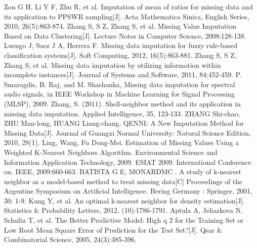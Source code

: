 \documentclass[print]{jicspack}
\begin{document}
\begin{thebibliography}{00}
 Zou G H, Li Y F, Zhu R, et al. Imputation of mean of ratios for missing data and its application to PPSWR sampling[J]. Acta Mathematica Sinica, English Series, 2010, 26(5):863-874.
 Zhang S, S Z, Zhang S, et al. Missing Value Imputation Based on Data Clustering[J]. Lecture Notes in Computer Science, 2008:128-138.
 Luengo J, Saez J A, Herrera F. Missing data imputation for fuzzy rule-based classification systems[J]. Soft Computing, 2012, 16(5):863-881.
 Zhang S, S Z, Zhang S, et al. Missing data imputation by utilizing information within incomplete instances[J]. Journal of Systems and Software, 2011, 84:452-459.
 P. Smaragdis, B. Raj, and M. Shashanka, Missing data imputation for spectral audio signals, in IEEE Workshop in Machine Learning for Signal Processing (MLSP), 2009.
 Zhang, S. (2011). Shell-neighbor method and its application in missing data imputation. Applied Intelligence, 35, 123-133.
 ZHANG Shi-chao, ZHU Man-long, HUANG Liang-chang. QENNI: A New Imputation Method for Missing Data[J]. Journal of Guangxi Normal University: Natural Science Edition, 2010, 28(1).
 Ling, Wang, Fu Dong-Mei. Estimation of Missing Values Using a Weighted K-Nearest Neighbors Algorithm. Environmental Science and Information Application Technology, 2009. ESIAT 2009. International Conference on. IEEE, 2009:660-663.
 BATISTA G E, MONARDMC . A study of k-nearest neighbor as a model-based method to treat missing data[C] Proceedings of the Argentine Symposium on Artificial Intelligence. Bering Germany : Springer, 2001, 30: 1-9.
 Kung Y, et al. An optimal k-nearest neighbor for density estimation[J]. Statistics \& Probability Letters, 2012, (10):1786-1791.
 Aptula A, Jeliazkova N, Schultz T, et al. The Better Predictive Model: High q 2 for the Training Set or Low Root Mean Square Error of Prediction for the Test Set?[J]. Qsar \& Combinatorial Science, 2005, 24(3):385-396.

\end{thebibliography}
\end{document}
